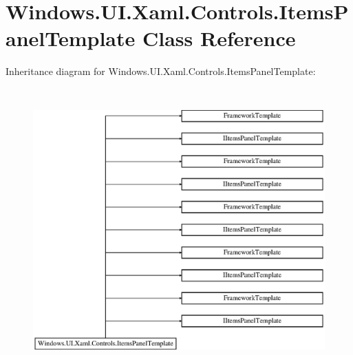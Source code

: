 \hypertarget{class_windows_1_1_u_i_1_1_xaml_1_1_controls_1_1_items_panel_template}{}\section{Windows.\+U\+I.\+Xaml.\+Controls.\+Items\+Panel\+Template Class Reference}
\label{class_windows_1_1_u_i_1_1_xaml_1_1_controls_1_1_items_panel_template}
Inheritance diagram for Windows.\+U\+I.\+Xaml.\+Controls.\+Items\+Panel\+Template\+:\begin{figure}[H]
\begin{center}
\leavevmode
\includegraphics[height=10.921986cm]{class_windows_1_1_u_i_1_1_xaml_1_1_controls_1_1_items_panel_template}
\end{center}
\end{figure}
